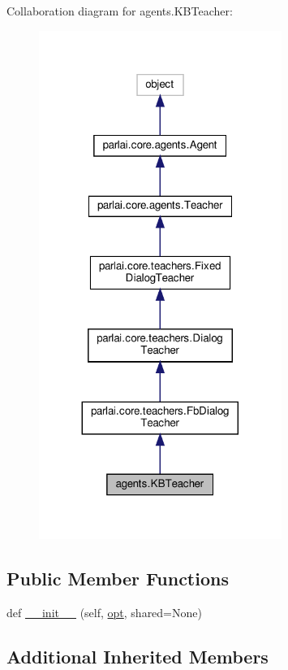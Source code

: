 Collaboration diagram for agents.\+K\+B\+Teacher\+:
\nopagebreak
\begin{figure}[H]
\begin{center}
\leavevmode
\includegraphics[width=224pt]{classagents_1_1KBTeacher__coll__graph}
\end{center}
\end{figure}
\subsection*{Public Member Functions}
\begin{DoxyCompactItemize}
\item 
def \hyperlink{classagents_1_1KBTeacher_af79ee04a7b32d7fc4fa41149bcc6f686}{\+\_\+\+\_\+init\+\_\+\+\_\+} (self, \hyperlink{classparlai_1_1core_1_1teachers_1_1FbDialogTeacher_af7a9ec497b9cd0292d7b8fa220da7c28}{opt}, shared=None)
\end{DoxyCompactItemize}
\subsection*{Additional Inherited Members}


